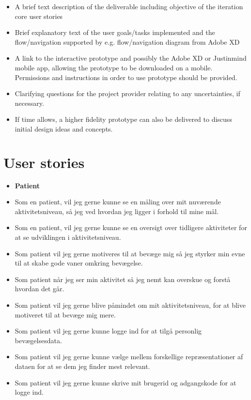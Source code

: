 \documentclass[10pt,a4paper]{article}
\begin{document}
\begin{itemize}

\item A brief text description of the deliverable including objective of the iteration core user stories

\item Brief explanatory text of the user goals/tasks implemented and the flow/navigation supported by e.g. flow/navigation diagram from Adobe XD

\item A link to the interactive prototype and possibly the Adobe XD or Justinmind mobile app, allowing the prototype to be downloaded on a mobile. Permissions and instructions in order to use prototype should be provided.

\item Clarifying questions for the project provider relating to any uncertainties, if necessary.

\item If time allows, a higher fidelity prototype can also be delivered to discuss initial design ideas and concepts.
\end{itemize}

\section{User stories}
\begin{itemize}
\item \textbf{Patient}
\item Som en patient, vil jeg gerne kunne se en måling over mit nuværende aktivitetsniveau, så jeg ved hvordan jeg ligger i forhold til mine mål.
\item Som en patient, vil jeg gerne kunne se en oversigt over tidligere aktiviteter for at se udviklingen i aktivitetsniveau.
\item Som patient vil jeg gerne motiveres til at bevæge mig så jeg styrker min evne til at skabe gode vaner omkring bevægelse. 
\item Som patient når jeg ser min aktivitet så jeg nemt kan overskue og forstå hvordan det går.
\item Som patient vil jeg gerne blive påmindet om mit aktivitetsniveau, for at blive motiveret til at bevæge mig mere.
\item Som patient vil jeg gerne kunne logge ind for at tilgå personlig bevægelsesdata.
\item Som patient vil jeg gerne kunne vælge mellem forskellige repræsentationer af dataen for at se dem jeg finder mest relevant.
\item Som patient vil jeg gerne kunne skrive mit brugerid og adgangskode for at logge ind.
\end{itemize}
\end{document}
